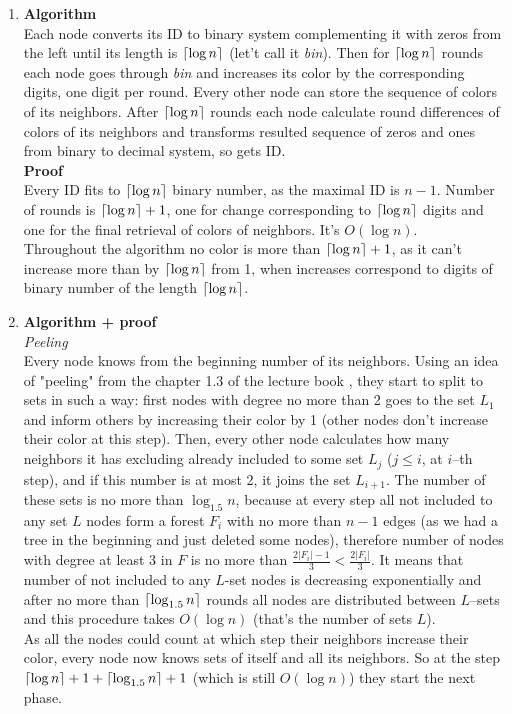 \documentclass[]{article}
\DeclarePairedDelimiter\ceil{\lceil}{\rceil}
\begin{document}
\begin{enumerate}
	\item \textbf{Algorithm}\\
	Each node converts its ID to binary system complementing it with zeros from the left until its length is $\ceil{\log n}$ (let't call it \textit{bin}). Then for $\ceil{\log n}$ rounds each node goes through \textit{bin} and increases its color by the corresponding digits, one digit per round. Every other node can store the sequence of colors of its neighbors. After $\ceil{\log n}$ rounds each node calculate round differences of colors of its neighbors and transforms resulted sequence of zeros and ones from binary to decimal system, so gets ID.\\
	\textbf{Proof}\\
	 Every ID fits to $\ceil{\log n}$ binary number, as the maximal ID is $n-1$. Number of rounds is $\ceil{\log n} + 1$, one for change corresponding to $\ceil{\log n}$ digits and one for the final retrieval of colors of neighbors. It's $O(\log n)$.\\
	Throughout the algorithm no color is more than $\ceil{\log n}+1$, as it can't increase more than by $\ceil{\log n}$ from 1, when increases correspond to digits of binary number of the length $\ceil{\log n}$.
	
	\item \textbf{Algorithm + proof}\\
	\textit{Peeling}\\
	 Every node knows from the beginning number of its neighbors.
	 Using an idea of "peeling" from the chapter 1.3 of the lecture book \cite{Ghaffari}, they start to split to sets in such a way: first nodes with degree no more than 2 goes to the set $L_1$ and inform others by increasing their color by 1 (other nodes don't increase their color at this step). Then, every other node calculates how many neighbors it has excluding already included to some set $L_j$ ($j \le i$, at $i$--th step), and if this number is at most 2, it joins the set $L_{i+1}$. The number of these sets is no more than $\log_{1.5}n$, because at every step all not included to any set $L$ nodes form a forest $F_i$ with no more than $n - 1$ edges (as we had a tree in the beginning and just deleted some nodes), therefore number of nodes with degree at least 3 in $F$ is no more than $\frac{2|F_i|-1}{3} < \frac{2|F_i|}{3}$. It means that number of not included to any $L$-set nodes is decreasing exponentially and after no more than $\ceil{\log_{1.5}n}$ rounds all nodes are distributed between $L$--sets and this procedure takes $O(\log n)$ (that's the number of sets $L$).\\
	 As all the nodes could count at which step their neighbors increase their color, every node now knows sets of itself and all its neighbors. So at the step $\ceil{\log n} + 1 + \ceil{\log_{1.5}n} + 1$ (which is still $O(\log n)$) they start the next phase.
	 

\end{enumerate}
\end{document}
